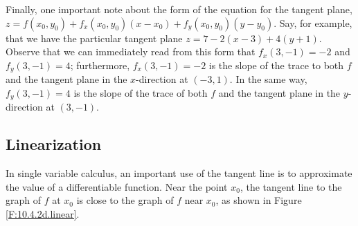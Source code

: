 \vspace*{5pt}
\nin {}
\vspace*{5pt}

Finally, one important note about the form of the equation for the tangent plane, $z = f(x_0,y_0) + f_x(x_0,y_0)(x-x_0) + f_y(x_0,y_0)(y-y_0)$.  Say, for example, that we have the particular tangent plane $z = 7 - 2(x-3) + 4(y+1)$.  Observe that we can immediately read from this form that  $f_x(3,-1) = -2$ and $f_y(3,-1) = 4$; furthermore, $f_x(3,-1)=-2$ is the slope of the trace to both $f$ and the tangent plane in the $x$-direction at $(-3,1)$.  In the same way, $f_y(3,-1) = 4$ is the slope of the trace of both $f$ and the tangent plane in the $y$-direction at $(3,-1)$.



\subsection*{Linearization}

In single variable calculus, an important use of the tangent line is
to approximate the value of a differentiable function.  Near the point $x_0$, the
tangent line to the graph of $f$ at $x_0$ is close to the
graph of $f$ near $x_0$, as shown in Figure \ref{F:10.4.2d.linear}.

